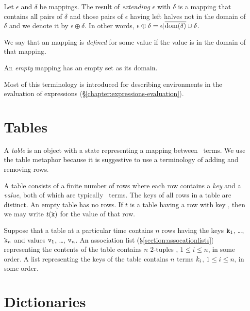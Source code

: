 Let $\epsilon$ and $\delta$ be mappings.  The result of \emph{extending}
$\epsilon$ with $\delta$ is a mapping that contains all pairs of $\delta$
and those pairs of $\epsilon$ having left halves not in the domain of $\delta$
and we denote it by $\epsilon\oplus\delta$.
In other words, $\epsilon\oplus\delta = \epsilon|\overline{{\rm dom}(\delta)}\cup\delta$.

We say that an mapping is \emph{defined} for some value if the value is
in the domain of that mapping.

An \emph{empty} mapping has an empty set as its domain.

Most of this terminology is introduced for describing
environments in the evaluation of
expressions (\S\ref{chapter:expressions-evaluation}).

\section{Tables}

\label{section:tables}
A \emph{table} is an object with a state representing a mapping
between \Erlang\ terms.  We use the table metaphor because it is
suggestive to use a terminology of adding and removing rows.

A table consists of a finite number of rows where each row contains a
\emph{key} and a
\emph{value}, both of which are typically
\Erlang\ terms.
The keys of all rows in a table are distinct.  An empty table has no
rows.  If $t$ is a table having a row with key , then we may
write $t({\tt{\sl k}})$ for the value of that row.

Suppose that a table at a particular time contains $n$ rows having the
keys ${\tt{\sl k}}_1$, \ldots, ${\tt{\sl k}}_n$ and values ${\tt{\sl v}}_1$, \ldots, ${\tt{\sl v}}_n$.
An association list (\S\ref{section:assocationlists}) representing the
contents of the table contains $n$ 2-tuples
, $1\leq i\leq n$, in some order.
A list representing the keys of the table contains $n$ terms ${\sl k}_i$,
$1\leq i\leq n$, in some order.

\iffalse
\section{Dictionaries}

